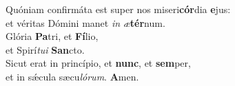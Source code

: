 \evenverse Quóniam confirmáta est super nos miseri\textbf{cór}dia \textbf{e}jus:~\*\\
\evenverse et véritas Dómini manet \textit{in} \textit{æ}\textbf{tér}num.\\
\oddverse Glória \textbf{Pa}tri, et \textbf{Fí}lio,~\*\\
\oddverse et Spirí\textit{tu}\textit{i} \textbf{San}cto.\\
\evenverse Sicut erat in princípio, et \textbf{nunc}, et \textbf{sem}per,~\*\\
\evenverse et in sǽcula sæcu\textit{ló}\textit{rum}. \textbf{A}men.\\
